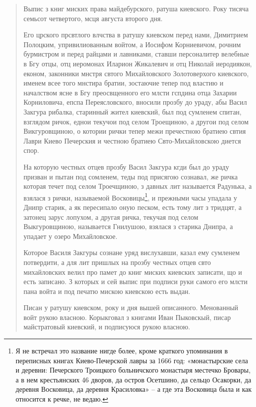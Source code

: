 \begin{quotation}
Выпис з книг миских права майдебурского, ратуша киевского. Року тисяча семьсот четвертого, мсця августа второго дня.

Его црского прсвтлого влчства в ратушу киевском перед нами, Димитрием Полоцким, упривилиованным войтом, а Иосифом Корниевичом, рочним бурмистром и перед райцами и лавниками, ставши персоналитер велебные в Бгу отцы, отц иеромонах Иларион Жикалевич и отц Николай иеродиякон, економ, законники мнстря свтого Михайловского Золотоверхого киевского, именем всее того мнстира братии, зостаючие тепер под властию и началством ясне в Бгу преосвщенного его млсти гспдина отца Захарии Корниловича, епспа
Переясловского, вносили прозбу до ураду, абы Васил Закгура рибалка, старинный жител киевский, был под сумленем спитан, взглядом ричок, еднои текучои под селом Троещиною, а другои под селом Викгуровщиною, о котории рички тепер межи пречестною братиею свтия Лаври Киево Печерския и честною братиею Свто-Михайловскою диется спор.

На которую честных отцев прозбу Васил Закгура кгди был до ураду призван и пытан под сомленем, теды под присягою сознавал, же ричка которая течет под селом Троечщиною, з давных лит называется Радунька, а взялася з рички, называемой Восковицы\footnote{Я не встречал это название нигде более, кроме краткого упоминания в переписных книгах Киево-Печерской лавры за 1666 год: «монастырские села и деревни: Печерского Троицкого больничского монастыря местечко Бровары, а в нем крестьянских 46 дворов, да остров Осетшино, да сельцо Осакорки, да деревня Восковица, да деревня Красиловка» – а где эта Восковица была и как относится к речке, не ведаю.}, и прежными часы упадала у Днипр старик, а як пересипало оную песком, есть тому лит з тридцят, а затонец зарус лопухом, а другая ричка, текучая под селом Выкгуровщиною, называется Гнилушою, взялася з старика Днипра, а упадает у озеро Михайловское. 

Которое Василя Закгуры сознане уряд вислухавши, казал ему сумленем потвердити, а для лит пришлых на прозбу честных отцев свто михайловских велил про памет до книг миских киевских записати, що и есть записано. З которых и сей выпис при подписи руки самого его млсти пана войта и под печатю мискою киевскою есть выдан.

Писан у ратушу киевском, року и дня вышей описанного. Менованный войт рукою власною.
Корыкговал з книгами Иван Пыковскый, писар майстратовый киевский, и подписуюся рукою власною.
\end{quotation}

